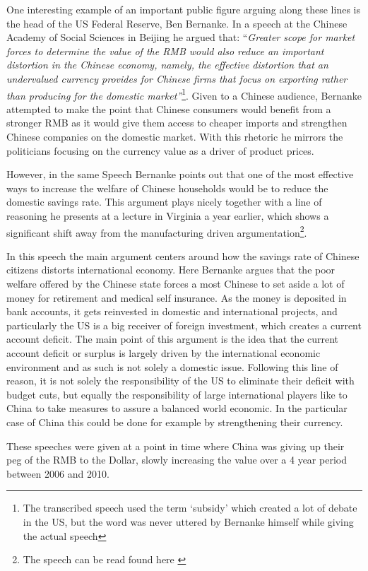 One interesting example of an important public figure arguing along 
these lines is the head of the US Federal Reserve, Ben Bernanke. In a 
speech at the Chinese Academy of Social Sciences in Beijing he argued 
that: ``\textit{Greater scope for market forces to determine the value 
	of the RMB would also reduce an important distortion in the Chinese 
	economy, namely, the effective distortion that an undervalued 
	currency provides for Chinese firms that focus on exporting rather 
than producing for the domestic market''}\footnote{The transcribed 
	speech \cite{Bernanke06} used the term `subsidy' which created a lot 
	of debate in the US, but the word was never uttered by Bernanke 
himself while giving the actual speech\cite{reuters06}}. Given to a 
Chinese audience, Bernanke attempted to make the point that Chinese 
consumers would benefit from a stronger RMB as it would give them access 
to cheaper imports and strengthen Chinese companies on the domestic 
market. With this rhetoric he mirrors the politicians focusing on the 
currency value as a driver of product prices.

However, in the same Speech Bernanke points out that one of the most 
effective ways to increase the welfare of Chinese households would be to 
reduce the domestic savings rate. This argument plays nicely together 
with a line of reasoning he presents at a lecture in Virginia a year 
earlier, which shows a significant shift away from the manufacturing 
driven argumentation\footnote{The speech can be read found here 
\cite{Bernanke05}}.

In this speech the main argument centers around how the savings rate 
of Chinese citizens distorts international economy. Here Bernanke argues 
that the poor welfare offered by the Chinese state forces a most Chinese 
to set aside a lot of money for retirement and medical self insurance.  
As the money is deposited in bank accounts, it gets reinvested in 
domestic and international projects, and particularly the US is a big 
receiver of foreign investment, which creates a current account deficit.  
The main point of this argument is the idea that the current account 
deficit or surplus is largely driven by the international economic 
environment and as such is not solely a domestic issue. Following this 
line of reason, it is not solely the responsibility of the US to 
eliminate their deficit with budget cuts, but equally the responsibility 
of large international players like to China to take measures to assure 
a balanced world economic. In the particular case of China this could be 
done for example by strengthening their currency.

These speeches were given at a point in time where China was giving up 
their peg of the RMB to the Dollar, slowly increasing the value over a 4 
year period between 2006 and 2010.
